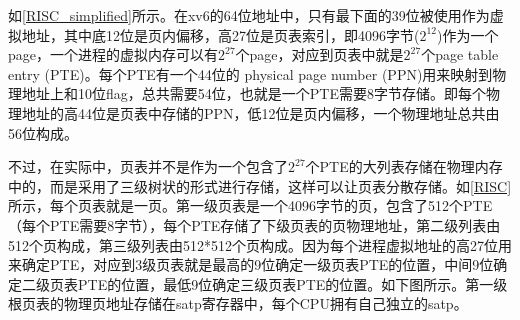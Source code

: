 如\cref{RISC_simplified}所示。在xv6的64位地址中，只有最下面的39位被使用作为虚拟地址，其中底12位是页内偏移，高27位是页表索引，即4096字节($2^{12}$)作为一个page，一个进程的虚拟内存可以有$2^{27}$个page，对应到页表中就是$2^{27}$个page table entry (PTE)。每个PTE有一个44位的 physical page number (PPN)用来映射到物理地址上和10位flag，总共需要54位，也就是一个PTE需要8字节存储。即每个物理地址的高44位是页表中存储的PPN，低12位是页内偏移，一个物理地址总共由56位构成。

不过，在实际中，页表并不是作为一个包含了$2^{27}$个PTE的大列表存储在物理内存中的，而是采用了三级树状的形式进行存储，这样可以让页表分散存储。如\cref{RISC}所示，每个页表就是一页。第一级页表是一个4096字节的页，包含了512个PTE（每个PTE需要8字节），每个PTE存储了下级页表的页物理地址，第二级列表由512个页构成，第三级列表由512*512个页构成。因为每个进程虚拟地址的高27位用来确定PTE，对应到3级页表就是最高的9位确定一级页表PTE的位置，中间9位确定二级页表PTE的位置，最低9位确定三级页表PTE的位置。如下图所示。第一级根页表的物理页地址存储在satp寄存器中，每个CPU拥有自己独立的satp。

